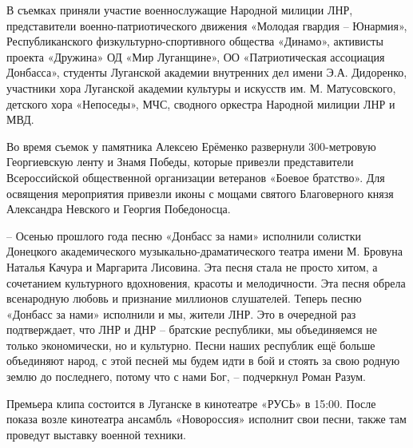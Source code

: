 В съемках приняли участие военнослужащие Народной милиции ЛНР, представители
военно-патриотического движения «Молодая гвардия – Юнармия», Республиканского
физкультурно-спортивного общества «Динамо», активисты проекта «Дружина» ОД «Мир
Луганщине», ОО «Патриотическая ассоциация Донбасса», студенты Луганской
академии внутренних дел имени Э.А. Дидоренко, участники хора Луганской академии
культуры и искусств им. М. Матусовского, детского хора «Непоседы», МЧС,
сводного оркестра Народной милиции ЛНР и МВД.

Во время съемок у памятника Алексею Ерёменко развернули 300-метровую
Георгиевскую ленту и Знамя Победы, которые привезли представители Всероссийской
общественной организации ветеранов «Боевое братство». Для освящения мероприятия
привезли иконы с мощами святого Благоверного князя Александра Невского и
Георгия Победоносца.

– Осенью прошлого года песню «Донбасс за нами» исполнили солистки Донецкого
академического музыкально-драматического театра имени М. Бровуна Наталья Качура
и Маргарита Лисовина. Эта песня стала не просто хитом, а сочетанием культурного
вдохновения, красоты и мелодичности. Эта песня обрела всенародную любовь и
признание миллионов слушателей. Теперь песню «Донбасс за нами» исполнили и мы,
жители ЛНР. Это в очередной раз подтверждает, что ЛНР и ДНР – братские
республики, мы объединяемся не только экономически, но и культурно. Песни наших
республик ещё больше объединяют народ, с этой песней мы будем идти в бой и
стоять за свою родную землю до последнего, потому что с нами Бог, – подчеркнул
Роман Разум.

Премьера клипа состоится в Луганске в кинотеатре «РУСЬ» в 15:00. После показа
возле кинотеатра ансамбль «Новороссия» исполнит свои песни, также там проведут
выставку военной техники.
